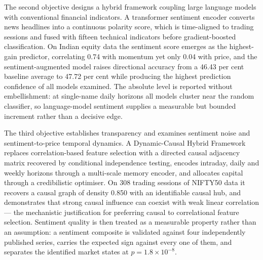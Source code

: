 The second objective designs a hybrid framework coupling large language models with
conventional financial indicators. A transformer sentiment encoder converts news headlines
into a continuous polarity score, which is time-aligned to trading sessions and fused with
fifteen technical indicators before gradient-boosted classification. On Indian equity data
the sentiment score emerges as the highest-gain predictor, correlating 0.74 with momentum
yet only 0.04 with price, and the sentiment-augmented model raises directional accuracy
from a 46.43 per cent baseline average to 47.72 per cent while producing the highest
prediction confidence of all models examined. The absolute level is reported without
embellishment: at single-name daily horizons all models cluster near the random
classifier, so language-model sentiment supplies a measurable but bounded increment rather
than a decisive edge.

The third objective establishes transparency and examines sentiment noise and
sentiment-to-price temporal dynamics. A Dynamic-Causal Hybrid Framework replaces
correlation-based feature selection with a directed causal adjacency matrix recovered by
conditional independence testing, encodes intraday, daily and weekly horizons through a
multi-scale memory encoder, and allocates capital through a credibilistic optimiser. On
308 trading sessions of NIFTY50 data it recovers a causal graph of density 0.850 with an
identifiable causal hub, and demonstrates that strong causal influence can coexist with
weak linear correlation --- the mechanistic justification for preferring causal to
correlational feature selection. Sentiment quality is then treated as a measurable
property rather than an assumption: a sentiment composite is validated against four
independently published series, carries the expected sign against every one of them, and
separates the identified market states at $p = 1.8 \times 10^{-8}$.

